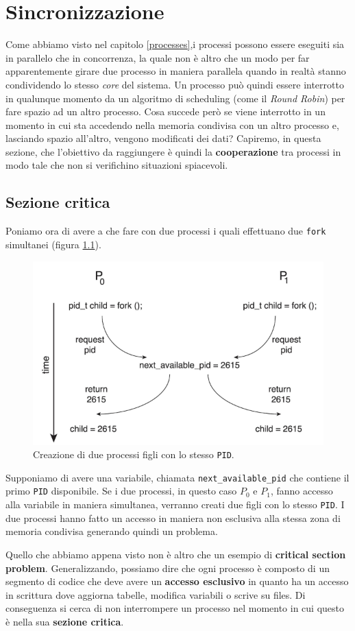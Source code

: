 \chapter{Sincronizzazione}\label{sincronizzazione}
Come abbiamo visto nel capitolo \ref{processes},i processi possono essere eseguiti sia in parallelo che in concorrenza, la quale non è altro che un modo per far apparentemente girare due processo in maniera parallela quando in realtà stanno condividendo lo stesso \textit{core} del sistema. Un processo può quindi essere interrotto in qualunque momento da un algoritmo di scheduling (come il \textit{Round Robin}) per fare spazio ad un altro processo. Cosa succede però se viene interrotto in un momento in cui sta accedendo nella memoria condivisa con un altro processo e, lasciando spazio all'altro, vengono modificati dei dati? Capiremo, in questa sezione, che l'obiettivo da raggiungere è quindi la \textbf{cooperazione} tra processi in modo tale che non si verifichino situazioni spiacevoli.

\section{Sezione critica}
Poniamo ora di avere a che fare con due processi i quali effettuano due \texttt{fork} simultanei (figura \ref{fig:sim_fork_issue}).
\begin{figure}[!h]
    \centering
    \includegraphics[width=.5\textwidth]{../res/imgs/synchronization/sim_fork_issue.png}
    \caption{Creazione di due processi figli con lo stesso \texttt{PID}.}
    \label{fig:sim_fork_issue}
\end{figure}
Supponiamo di avere una variabile, chiamata \texttt{next\_available\_pid} che contiene il primo \texttt{PID} disponibile. Se i due processi, in questo caso $P_0$ e $P_1$, fanno accesso alla variabile in maniera simultanea, verranno creati due figli con lo stesso \texttt{PID}. I due processi hanno fatto un accesso in maniera non esclusiva alla stessa zona di memoria condivisa generando quindi un problema.

Quello che abbiamo appena visto non è altro che un esempio di \textbf{critical section problem}. Generalizzando, possiamo dire che ogni processo è composto di un segmento di codice che deve avere un \textbf{accesso esclusivo} in quanto ha un accesso in scrittura dove aggiorna tabelle, modifica variabili o scrive su files. Di conseguenza si cerca di non interrompere un processo nel momento in cui questo è nella sua \textbf{sezione critica}.
% 
